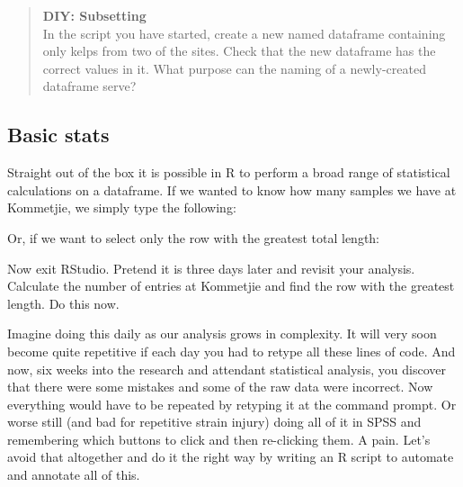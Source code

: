 \documentclass[]{book}
\newenvironment{Shaded}{\begin{snugshade}}{\end{snugshade}}
\newcommand{\KeywordTok}[1]{\textcolor[rgb]{0.13,0.29,0.53}{\textbf{#1}}}
\newcommand{\StringTok}[1]{\textcolor[rgb]{0.31,0.60,0.02}{#1}}
\newcommand{\CommentTok}[1]{\textcolor[rgb]{0.56,0.35,0.01}{\textit{#1}}}
\newcommand{\OperatorTok}[1]{\textcolor[rgb]{0.81,0.36,0.00}{\textbf{#1}}}
\newcommand{\NormalTok}[1]{#1}
\theoremstyle{definition}
\theoremstyle{definition}
\theoremstyle{definition}
\theoremstyle{remark}
\begin{document}
\begin{quote}
\textbf{DIY: Subsetting}\\
In the script you have started, create a new named dataframe containing
only kelps from two of the sites. Check that the new dataframe has the
correct values in it. What purpose can the naming of a newly-created
dataframe serve?
\end{quote}

\subsection{Basic stats}\label{basic-stats}

Straight out of the box it is possible in R to perform a broad range of
statistical calculations on a dataframe. If we wanted to know how many
samples we have at Kommetjie, we simply type the following:

\begin{Shaded}
\end{Shaded}

Or, if we want to select only the row with the greatest total length:

\begin{Shaded}
\end{Shaded}

Now exit RStudio. Pretend it is three days later and revisit your
analysis. Calculate the number of entries at Kommetjie and find the row
with the greatest length. Do this now.

Imagine doing this daily as our analysis grows in complexity. It will
very soon become quite repetitive if each day you had to retype all
these lines of code. And now, six weeks into the research and attendant
statistical analysis, you discover that there were some mistakes and
some of the raw data were incorrect. Now everything would have to be
repeated by retyping it at the command prompt. Or worse still (and bad
for repetitive strain injury) doing all of it in SPSS and remembering
which buttons to click and then re-clicking them. A pain. Let's avoid
that altogether and do it the right way by writing an R script to
automate and annotate all of this.
\end{document}
